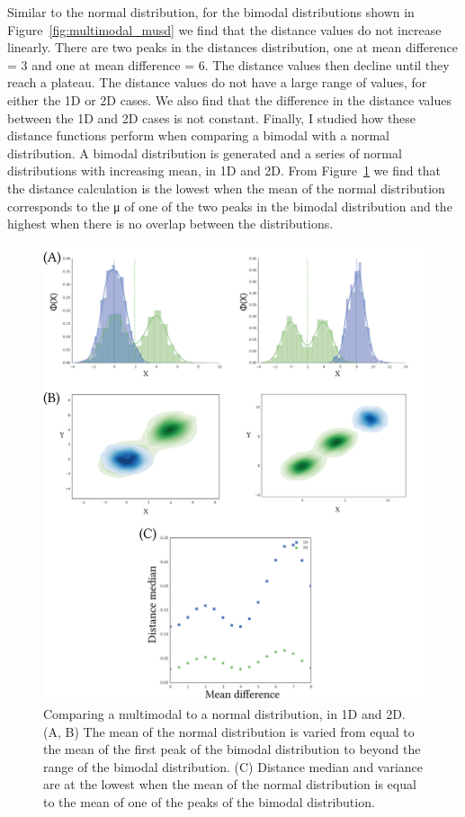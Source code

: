 Similar to the normal distribution, for the bimodal distributions shown in Figure~\ref{fig:multimodal_musd} we find that the distance values do not increase linearly. There are two peaks in the distances distribution, one at mean difference = 3 and one at mean difference = 6. The distance values then decline until they reach a plateau. The distance values do not have a large range of values, for either the 1D or 2D cases. We also find that the difference in the distance values between the 1D and 2D cases is not constant. Finally, I studied how these distance functions perform when comparing a bimodal with a normal distribution. A bimodal distribution is generated and a series of normal distributions with increasing mean, in 1D and 2D. From Figure~\ref{fig:multimodal_v_normal} we find that the distance calculation is the lowest when the mean of the normal distribution corresponds to the μ of one of the two peaks in the bimodal distribution and the highest when there is no overlap between the distributions.


\begin{figure}[tb]
\centering
\includegraphics[scale=0.7]{../../chapters/chapterABCFlow/images/multimodal_v_normal.png}
\caption[Distance value ranges of bimodal and uniform distributions using the kernel distance]{Comparing a multimodal to a normal distribution, in 1D and 2D. (A, B) The mean of the normal distribution is varied from equal to the mean of the first peak of the bimodal distribution to beyond the range of the bimodal distribution. (C) Distance median and variance are at the lowest when the mean of the normal distribution is equal to the mean of one of the peaks of the bimodal distribution. }
\label{fig:multimodal_v_normal}
\end{figure}



